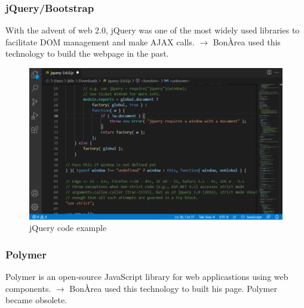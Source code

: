 \documentclass[12pt]{article}
\begin{document}
\subsubsection*{jQuery/Bootstrap}
With the advent of web 2.0, jQuery was one of the most widely used libraries to facilitate DOM management and make AJAX calls. $\longrightarrow$ BonÀrea used this technology to build the webpage in the past.
\begin{figure}[H]
    \centering
    \includegraphics[scale = 0.7]{Images/1639283353HPj4hCHgBW.png}
    \caption{jQuery code example}
    \label{fig:jQuery}
\end{figure}
\subsubsection*{Polymer}
Polymer is an open-source JavaScript library for web applicastions using web components. $\longrightarrow$ BonÀrea used this technology to built his page. Polymer became obsolete.
\end{document}
